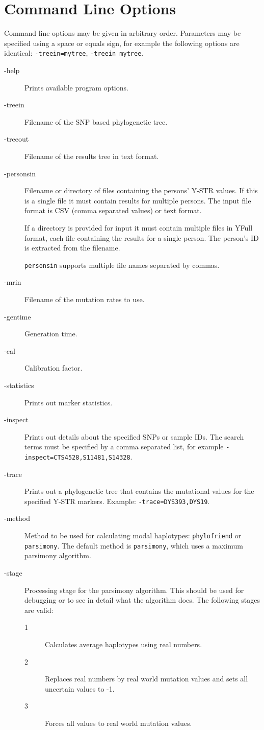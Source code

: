 \section{Command Line Options}

Command line options may be given in arbitrary order.
Parameters may be specified using a space or equals sign,
for example the following options are identical:
\texttt{-treein=mytree}, \texttt{-treein mytree}.

\begin{description}
\item[-help] Prints available program options.

\item[-treein] Filename of the SNP based phylogenetic tree.
\item[-treeout] Filename of the results tree in text format.
\item[-personsin] Filename or directory of files containing the
	persons' Y-STR values. If this is a single file it must contain
	results for multiple persons. The input file format is CSV
    (comma separated values) or text format.

	If a directory is provided for input it must contain multiple
	files in YFull format, each file containing the results for
	a single person. The person's ID is extracted from the filename.

	\texttt{personsin} supports multiple file names separated by
	commas.
\item[-mrin] Filename of the mutation rates to use.
\item[-gentime] Generation time.
\item[-cal] Calibration factor.
\item[-statistics] Prints out marker statistics.
\item[-inspect] Prints out details about the specified SNPs or
	sample IDs. The search terms must be specified by a comma
	separated list, for example \texttt{-inspect=CTS4528,S11481,S14328}.
\item[-trace] Prints out a phylogenetic tree that contains the
	mutational values for the specified Y-STR markers. Example:
	\texttt{-trace=DYS393,DYS19}.
\item[-method] Method to be used for calculating modal haplotypes:
	\texttt{phylofriend} or \texttt{parsimony}. The default method
	is \texttt{parsimony}, which uses a maximum parsimony algorithm.
\item[-stage] Processing stage for the parsimony algorithm. This
	should be used for debugging or to see in detail what the algorithm
	does. The following stages are valid:
	\begin{description}
	\item[1] Calculates average haplotypes using real numbers.
	\item[2] Replaces real numbers by real world mutation values
		and sets all uncertain values to -1.
	\item[3] Forces all values to real world mutation values.
	\end{description}
\end{description}

